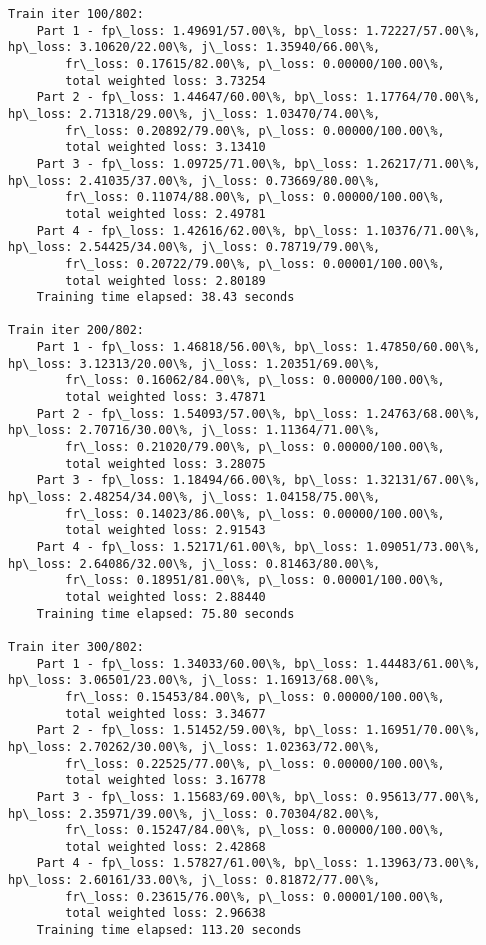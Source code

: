 \documentclass[11pt]{article}
\begin{document}
\begin{Verbatim}[commandchars=\\\{\}]
Train iter 100/802:
	Part 1 - fp\_loss: 1.49691/57.00\%, bp\_loss: 1.72227/57.00\%, hp\_loss: 3.10620/22.00\%, j\_loss: 1.35940/66.00\%, 
		fr\_loss: 0.17615/82.00\%, p\_loss: 0.00000/100.00\%, 
		total weighted loss: 3.73254
	Part 2 - fp\_loss: 1.44647/60.00\%, bp\_loss: 1.17764/70.00\%, hp\_loss: 2.71318/29.00\%, j\_loss: 1.03470/74.00\%, 
		fr\_loss: 0.20892/79.00\%, p\_loss: 0.00000/100.00\%, 
		total weighted loss: 3.13410
	Part 3 - fp\_loss: 1.09725/71.00\%, bp\_loss: 1.26217/71.00\%, hp\_loss: 2.41035/37.00\%, j\_loss: 0.73669/80.00\%, 
		fr\_loss: 0.11074/88.00\%, p\_loss: 0.00000/100.00\%, 
		total weighted loss: 2.49781
	Part 4 - fp\_loss: 1.42616/62.00\%, bp\_loss: 1.10376/71.00\%, hp\_loss: 2.54425/34.00\%, j\_loss: 0.78719/79.00\%, 
		fr\_loss: 0.20722/79.00\%, p\_loss: 0.00001/100.00\%, 
		total weighted loss: 2.80189
	Training time elapsed: 38.43 seconds

Train iter 200/802:
	Part 1 - fp\_loss: 1.46818/56.00\%, bp\_loss: 1.47850/60.00\%, hp\_loss: 3.12313/20.00\%, j\_loss: 1.20351/69.00\%, 
		fr\_loss: 0.16062/84.00\%, p\_loss: 0.00000/100.00\%, 
		total weighted loss: 3.47871
	Part 2 - fp\_loss: 1.54093/57.00\%, bp\_loss: 1.24763/68.00\%, hp\_loss: 2.70716/30.00\%, j\_loss: 1.11364/71.00\%, 
		fr\_loss: 0.21020/79.00\%, p\_loss: 0.00000/100.00\%, 
		total weighted loss: 3.28075
	Part 3 - fp\_loss: 1.18494/66.00\%, bp\_loss: 1.32131/67.00\%, hp\_loss: 2.48254/34.00\%, j\_loss: 1.04158/75.00\%, 
		fr\_loss: 0.14023/86.00\%, p\_loss: 0.00000/100.00\%, 
		total weighted loss: 2.91543
	Part 4 - fp\_loss: 1.52171/61.00\%, bp\_loss: 1.09051/73.00\%, hp\_loss: 2.64086/32.00\%, j\_loss: 0.81463/80.00\%, 
		fr\_loss: 0.18951/81.00\%, p\_loss: 0.00001/100.00\%, 
		total weighted loss: 2.88440
	Training time elapsed: 75.80 seconds

Train iter 300/802:
	Part 1 - fp\_loss: 1.34033/60.00\%, bp\_loss: 1.44483/61.00\%, hp\_loss: 3.06501/23.00\%, j\_loss: 1.16913/68.00\%, 
		fr\_loss: 0.15453/84.00\%, p\_loss: 0.00000/100.00\%, 
		total weighted loss: 3.34677
	Part 2 - fp\_loss: 1.51452/59.00\%, bp\_loss: 1.16951/70.00\%, hp\_loss: 2.70262/30.00\%, j\_loss: 1.02363/72.00\%, 
		fr\_loss: 0.22525/77.00\%, p\_loss: 0.00000/100.00\%, 
		total weighted loss: 3.16778
	Part 3 - fp\_loss: 1.15683/69.00\%, bp\_loss: 0.95613/77.00\%, hp\_loss: 2.35971/39.00\%, j\_loss: 0.70304/82.00\%, 
		fr\_loss: 0.15247/84.00\%, p\_loss: 0.00000/100.00\%, 
		total weighted loss: 2.42868
	Part 4 - fp\_loss: 1.57827/61.00\%, bp\_loss: 1.13963/73.00\%, hp\_loss: 2.60161/33.00\%, j\_loss: 0.81872/77.00\%, 
		fr\_loss: 0.23615/76.00\%, p\_loss: 0.00001/100.00\%, 
		total weighted loss: 2.96638
	Training time elapsed: 113.20 seconds


\end{Verbatim}
\end{document}
